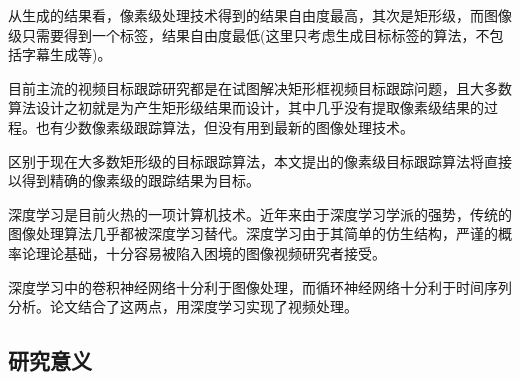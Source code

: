 \par
从生成的结果看，像素级处理技术得到的结果自由度最高，其次是矩形级，而图像级只需要得到一个标签，结果自由度最低(这里只考虑生成目标标签的算法，不包括字幕生成等)。
\par
目前主流的视频目标跟踪研究都是在试图解决矩形框视频目标跟踪问题，且大多数算法设计之初就是为产生矩形级结果而设计，其中几乎没有提取像素级结果的过程。也有少数像素级跟踪算法，但没有用到最新的图像处理技术。
\par
区别于现在大多数矩形级的目标跟踪算法，本文提出的像素级目标跟踪算法将直接以得到精确的像素级的跟踪结果为目标。
\par
深度学习是目前火热的一项计算机技术。近年来由于深度学习学派的强势，传统的图像处理算法几乎都被深度学习替代。深度学习由于其简单的仿生结构，严谨的概率论理论基础，十分容易被陷入困境的图像视频研究者接受。
\par
深度学习中的卷积神经网络十分利于图像处理，而循环神经网络十分利于时间序列分析。论文结合了这两点，用深度学习实现了视频处理。

\subsection{研究意义}

